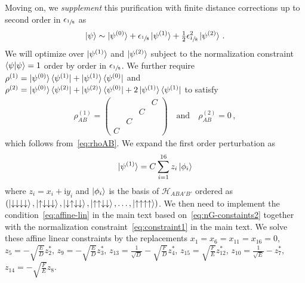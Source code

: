 \documentclass[prl,a4paper,notitlepage,twocolumn,superscriptaddress,longbibliography,reprint]{revtex4-2}
\newcommand{\ii}{\mathrm{i}}
\begin{document}
Moving on, we \emph{supplement} this purification with finite distance corrections up to second order in $\epsilon_{\sfrac{1}{8}}$ as
\begin{align}
    \ket{\psi}\sim \ket{\psi^{(0)}}+\epsilon_{\sfrac{1}{8}} \ket{\psi^{(1)}}+\tfrac{1}{2}\epsilon_{\sfrac{1}{8}}^2 \ket{\psi^{(2)}}\,.
\end{align}
\normalsize
We will optimize over $\ket{\psi^{(1)}}$ and $\ket{\psi^{(2)}}$ subject to the normalization constraint $\braket{\psi|\psi}=1$ order by order in $\epsilon_{\sfrac{1}{8}}$. We further require $\rho^{(1)}=\ket{\psi^{(0)}}\bra{\psi^{(1)}}+\ket{\psi^{(1)}}\bra{\psi^{(0)}}$ and $\rho^{(2)}=\ket{\psi^{(0)}}\bra{\psi^{(2)}}+\ket{\psi^{(2)}}\bra{\psi^{(0)}}+2\ket{\psi^{(1)}}\bra{\psi^{(1)}}$ to satisfy
\begin{align}
    \rho^{(1)}_{AB}=\begin{pmatrix}
     &&&C\\
     &&C&\\
     &C&&\\
     C&&&
    \end{pmatrix}\quad\text{and}\quad \rho^{(2)}_{AB}=0\,,\label{eq:nG-constaints2}
\end{align}
which follows from\ \eqref{eq:rhoAB}. We expand the first order perturbation as
\begin{align}
    \ket{\psi^{(1)}}=C\sum^{16}_{i=1} z_i\ket{\phi_i}
\end{align}
where $z_i=x_i+\ii y_i$ and $\ket{\phi_i}$ is the basis of $\mathcal{H}_{ABA'B'}$ ordered as $(\ket{\downarrow\downarrow\downarrow\downarrow},\ket{\uparrow\downarrow\downarrow\downarrow},\ket{\downarrow\uparrow\downarrow\downarrow},\ket{\uparrow\uparrow\downarrow\downarrow},\dots,\ket{\uparrow\uparrow\uparrow\uparrow})$. We then need to implement the condition~\eqref{eq:affine-lin} in the main text based on~\eqref{eq:nG-constaints2} together with the normalization constraint~\eqref{eq:constraint1} in the main text. We solve these affine linear constraints by the replacements $x_1=x_6=x_{11}=x_{16}=0$, $z_{5}=-\sqrt{\frac{E}{D}}z_2^*$, $z_{9}=-\sqrt{\frac{E}{D}}z_3^*$, $z_{13}=\frac{1}{\sqrt{D}}-\sqrt{\frac{F}{D}}z_4^*$, $z_{15}=\sqrt{\frac{F}{E}}z_{12}^*$, $z_{10}=\frac{1}{\sqrt{E}}-z_{7}^*$, $z_{14}=-\sqrt{\frac{F}{E}}z_8$.
\end{document}
